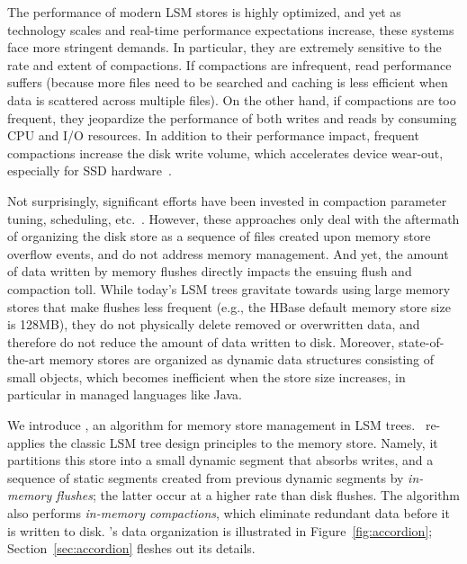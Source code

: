 The performance of modern LSM stores is highly optimized, and yet as technology scales and real-time 
performance expectations increase, these systems face more stringent  demands. In particular, 
they are extremely sensitive to the rate and extent of compactions. If compactions are infrequent, read performance
suffers (because more files need to be searched and caching is less efficient when  data is scattered across multiple files). On the other hand, if 
compactions are too frequent, they jeopardize the performance of both writes and reads by consuming CPU and I/O resources. 
In addition to their performance impact, frequent compactions increase the disk write volume, which  
accelerates device wear-out, especially for SSD hardware~\cite{Hu:2009}. 

Not surprisingly, significant efforts have been invested in compaction parameter tuning, scheduling, etc.~\cite{hbasetuning,
universalcompaction,scylladbcompaction,Sears:2012}. However, these approaches only deal with the aftermath
of organizing the disk store as a sequence of files created upon memory store overflow events, and do not 
address memory management. And yet, the amount of data written by memory flushes  
directly impacts the ensuing flush and compaction toll. 
While today's LSM trees gravitate towards using large memory 
stores that make flushes less frequent (e.g., the HBase default memory store size is 128MB), 
they do not physically delete removed or overwritten data,
and therefore do not reduce the amount of data written to disk.
Moreover, state-of-the-art memory stores are organized as dynamic data structures consisting of small objects,
which becomes inefficient when the store size increases, in particular in managed languages like Java. 

We introduce \sys, an algorithm for memory store management in LSM trees. 
\sys\ re-applies the classic LSM tree design principles to the memory store. Namely, it partitions this store
 into a small dynamic segment that absorbs writes, and a sequence of static segments created 
 from previous dynamic segments by \emph{in-memory flushes}; the latter occur at a higher rate
 than disk flushes.  The algorithm also 
 performs \emph{in-memory compactions}, which eliminate redundant %
 data before it is written to disk.
  \sys's data organization is illustrated in Figure~\ref{fig:accordion};
 Section~\ref{sec:accordion} fleshes out its details.

